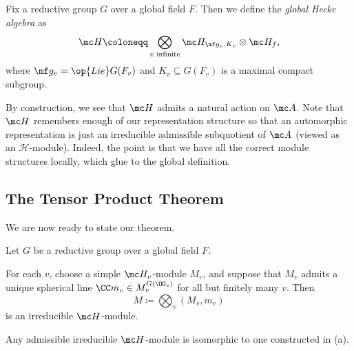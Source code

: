 \documentclass[../notes.tex]{subfiles}
\begin{document}
\begin{definition}
	Fix a reductive group $G$ over a global field $F$. Then we define the \textit{global Hecke algebra} as
	\[\mc H\coloneqq\bigotimes_{v\text{ infinite}}\mc H_{\mf g_v,K_v}\otimes\mc H_f,\]
	where $\mf g_v=\op{Lie}G(F_v)$ and $K_v\subseteq G(F_v)$ is a maximal compact subgroup.
\end{definition}
By construction, we see that $\mc H$ admits a natural action on $\mc A$. Note that $\mc H$ remembers enough of our representation structure so that an automorphic representation is just an irreducible admissible subquotient of $\mc A$ (viewed as an $\mathcal H$-module). Indeed, the point is that we have all the correct module structures locally, which glue to the global definition.

\subsection{The Tensor Product Theorem}
We are now ready to state our theorem.
\begin{theorem}
	Let $G$ be a reductive group over a global field $F$.
	\begin{listalph}
		\item For each $v$, choose a simple $\mc H_v$-module $M_v$, and suppose that $M_v$ admits a unique spherical line $\CC m_v\in M_v^{G(\OO_v)}$ for all but finitely many $v$. Then
		\[M\coloneqq\bigotimes_v(M_v,m_v)\]
		is an irreducible $\mc H$-module.
		\item Any admissible irreducible $\mc H$-module is isomorphic to one constructed in (a).
	\end{listalph}
\end{theorem}
\end{document}

